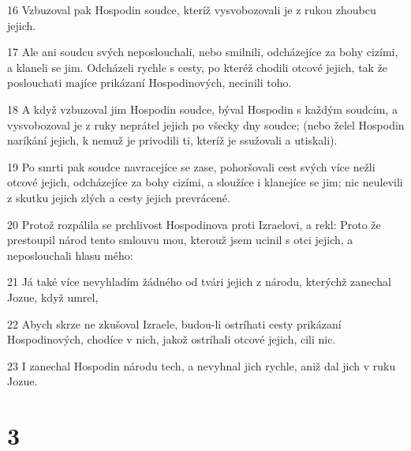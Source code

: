 \par 16 Vzbuzoval pak Hospodin soudce, kteríž vysvobozovali je z rukou zhoubcu jejich.
\par 17 Ale ani soudcu svých neposlouchali, nebo smilnili, odcházejíce za bohy cizími, a klaneli se jim. Odcházeli rychle s cesty, po kteréž chodili otcové jejich, tak že poslouchati majíce prikázaní Hospodinových, necinili toho.
\par 18 A když vzbuzoval jim Hospodin soudce, býval Hospodin s každým soudcím, a vysvobozoval je z ruky neprátel jejich po všecky dny soudce; (nebo želel Hospodin naríkání jejich, k nemuž je privodili ti, kteríž je ssužovali a utiskali).
\par 19 Po smrti pak soudce navracejíce se zase, pohoršovali cest svých více nežli otcové jejich, odcházejíce za bohy cizími, a sloužíce i klanejíce se jim; nic neulevili z skutku jejich zlých a cesty jejich prevrácené.
\par 20 Protož rozpálila se prchlivost Hospodinova proti Izraelovi, a rekl: Proto že prestoupil národ tento smlouvu mou, kterouž jsem ucinil s otci jejich, a neposlouchali hlasu mého:
\par 21 Já také více nevyhladím žádného od tvári jejich z národu, kterýchž zanechal Jozue, když umrel,
\par 22 Abych skrze ne zkušoval Izraele, budou-li ostríhati cesty prikázaní Hospodinových, chodíce v nich, jakož ostríhali otcové jejich, cili nic.
\par 23 I zanechal Hospodin národu tech, a nevyhnal jich rychle, aniž dal jich v ruku Jozue.

\chapter{3}

